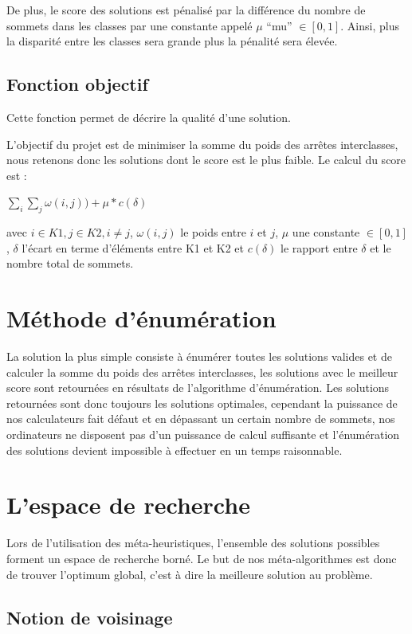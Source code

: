 \documentclass[a4paper]{article}
\begin{document}
	De plus, le score des solutions est pénalisé par la différence du nombre de sommets dans les classes par une constante appelé $\mu$ ``mu'' $\in [0,1]$. Ainsi, plus la disparité entre les classes sera grande plus la pénalité sera élevée.

	\subsection{Fonction objectif}
	Cette fonction permet de décrire la qualité d'une solution.


	L'objectif du projet est de minimiser la somme du poids des arrêtes interclasses, nous retenons donc les solutions dont le score est le plus faible. Le calcul du score est : 
	\begin{center}
	$\sum\limits_{i} \sum\limits_{j}  \omega (i,j)) + \mu * c(\delta)$
	\end{center}
	avec $i \in K1, j \in K2, i \ne j$, $\omega (i,j)$ le poids entre $i$ et $j$, $\mu$ une constante $\in [0,1]$, $\delta$ l'écart en terme d'éléments entre K1 et K2 et $c(\delta)$ le rapport entre $\delta$ et le nombre total de sommets.

\section{Méthode d’énumération}
La solution la plus simple consiste à énumérer toutes les solutions valides et de calculer la somme du poids des arrêtes interclasses, les solutions avec le meilleur score sont retournées en résultats de l'algorithme d'énumération. Les solutions retournées sont donc toujours les solutions optimales, cependant la puissance de nos calculateurs fait défaut et en dépassant un certain nombre de sommets, nos ordinateurs ne disposent pas d'un puissance de calcul suffisante et l'énumération des solutions devient impossible à effectuer en un temps raisonnable.

\section{L'espace de recherche}
Lors de l'utilisation des méta-heuristiques, l'ensemble des solutions possibles forment un espace de recherche borné. Le but de nos méta-algorithmes est donc de trouver l'optimum global, c'est à dire la meilleure solution au problème.
	\subsection{Notion de voisinage}
\end{document}

